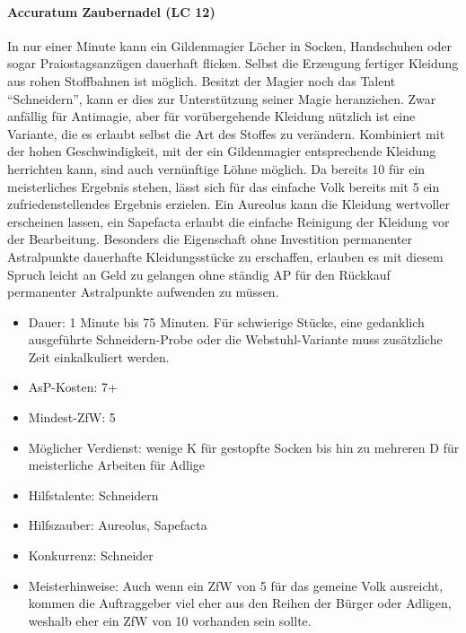 \paragraph{Accuratum Zaubernadel (LC 12)}
In nur einer Minute kann ein Gildenmagier Löcher in Socken, Handschuhen oder sogar Praiostagsanzügen dauerhaft flicken. Selbst die Erzeugung fertiger Kleidung aus rohen Stoffbahnen ist möglich. Besitzt der Magier noch das Talent \enquote{Schneidern}, kann er dies zur Unterstützung seiner Magie heranziehen. Zwar anfällig für Antimagie, aber für vorübergehende Kleidung nützlich ist eine Variante, die es erlaubt selbst die Art des Stoffes zu verändern. Kombiniert mit der hohen Geschwindigkeit, mit der ein Gildenmagier entsprechende Kleidung herrichten kann, sind auch vernünftige Löhne möglich. Da bereits \SI{10}{\ZfPstern} für ein meisterliches Ergebnis stehen, lässt sich für das einfache Volk bereits mit \SI{5}{\ZfPstern} ein zufriedenstellendes Ergebnis erzielen. Ein Aureolus kann die Kleidung wertvoller erscheinen lassen, ein Sapefacta erlaubt die einfache Reinigung der Kleidung vor der Bearbeitung. Besonders die Eigenschaft ohne Investition permanenter Astralpunkte dauerhafte Kleidungsstücke zu erschaffen, erlauben es mit diesem Spruch leicht an Geld zu gelangen ohne ständig AP für den Rückkauf permanenter Astralpunkte aufwenden zu müssen.
\begin{itemize}
	\item Dauer: 1 Minute bis 75 Minuten. Für schwierige Stücke, eine gedanklich ausgeführte Schneidern-Probe oder die Webstuhl-Variante muss zusätzliche Zeit einkalkuliert werden.
	\item AsP-Kosten: 7+
	\item Mindest-ZfW: 5
	\item Möglicher Verdienst: wenige K für gestopfte Socken bis hin zu mehreren D für meisterliche Arbeiten für Adlige
	\item Hilfstalente: Schneidern
	\item Hilfszauber: Aureolus, Sapefacta
	\item Konkurrenz: Schneider
	\item Meisterhinweise: Auch wenn ein ZfW von 5 für das gemeine Volk ausreicht, kommen die Auftraggeber viel eher aus den Reihen der Bürger oder Adligen, weshalb eher ein ZfW von 10 vorhanden sein sollte.
\end{itemize}

